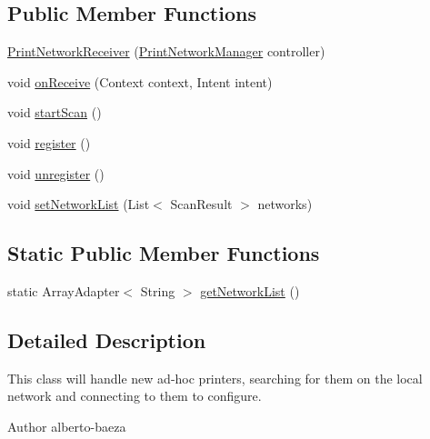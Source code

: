 \subsection*{Public Member Functions}
\begin{DoxyCompactItemize}
\item 
\hyperlink{classandroid_1_1app_1_1printerapp_1_1devices_1_1discovery_1_1_print_network_receiver_a5cc7d94a8b1627539abc1e8b9851d2bc}{Print\+Network\+Receiver} (\hyperlink{classandroid_1_1app_1_1printerapp_1_1devices_1_1discovery_1_1_print_network_manager}{Print\+Network\+Manager} controller)
\item 
void \hyperlink{classandroid_1_1app_1_1printerapp_1_1devices_1_1discovery_1_1_print_network_receiver_a5ea37e7d7fe9c0c8d8768458e5310895}{on\+Receive} (Context context, Intent intent)
\item 
void \hyperlink{classandroid_1_1app_1_1printerapp_1_1devices_1_1discovery_1_1_print_network_receiver_a95fcd1254785cc2b26a254cb271f5bcd}{start\+Scan} ()
\item 
void \hyperlink{classandroid_1_1app_1_1printerapp_1_1devices_1_1discovery_1_1_print_network_receiver_a3ba05dd871e0347b9d8a9e901823fd0a}{register} ()
\item 
void \hyperlink{classandroid_1_1app_1_1printerapp_1_1devices_1_1discovery_1_1_print_network_receiver_a4737b471fee26675b2ba323b7fd89229}{unregister} ()
\item 
void \hyperlink{classandroid_1_1app_1_1printerapp_1_1devices_1_1discovery_1_1_print_network_receiver_a03c2c2c4d587d4c53d0b7107b9271aa4}{set\+Network\+List} (List$<$ Scan\+Result $>$ networks)
\end{DoxyCompactItemize}
\subsection*{Static Public Member Functions}
\begin{DoxyCompactItemize}
\item 
static Array\+Adapter$<$ String $>$ \hyperlink{classandroid_1_1app_1_1printerapp_1_1devices_1_1discovery_1_1_print_network_receiver_a05bd9917588dedd5721409a4192b873f}{get\+Network\+List} ()
\end{DoxyCompactItemize}


\subsection{Detailed Description}
This class will handle new ad-\/hoc printers, searching for them on the local network and connecting to them to configure. \begin{DoxyAuthor}{Author}
alberto-\/baeza 
\end{DoxyAuthor}


